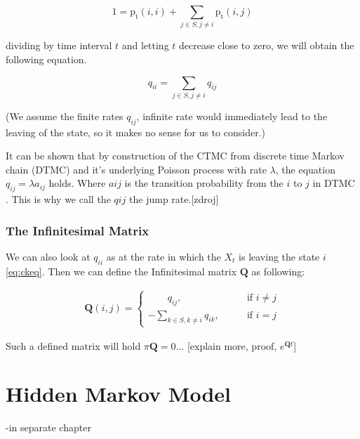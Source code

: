 \documentclass[thesis=M,english]{FITthesis}[2012/10/20]
\newcommand{\matr}[1]{\mathbf{#1}}
\begin{document}
\begin{equation}
1 = \mathrm{p_t}(i,i) + \sum_{j \in S ,j \neq i} \mathrm{p_t}(i,j) 
\end{equation}

dividing by time interval $t$ and letting $t$ decrease close to zero, we will obtain the following equation. 

\begin{equation}\label{eq:qii}
 q_{ii} =  \sum_{j \in S ,j \neq i} q_{ij} 
\end{equation}

(We assume the finite rates $q_{ij}$, infinite rate would immediately lead to the leaving of the state, so it makes no sense for us to consider.)

It can be shown that by construction of the CTMC from discrete time Markov chain (DTMC) and  it's underlying Poisson process with rate $\lambda$, the equation $q_{ij} = \lambda a_{ij}$ holds. Where $a{ij}$ is the transition probability from the $i$ to $j$ in DTMC \label{eq:tp}. This is why we call the $q{ij}$ the jump rate.[zdroj]  


\subsubsection{The Infinitesimal Matrix}

We can also look at $q_{ii}$ as at the rate in which the $X_t$ is leaving the state $i$ \eqref{eq:ckeq}. Then we can define the Infinitesimal matrix $\matr{Q}$ as following:

\begin{equation}
\begin{aligned}  
\matr{Q}(i,j)= 
\begin{cases}
\qquad q_{ij}, \qquad & \text{if } i\neq j\\
- \sum\limits_{k \in S ,k \neq i} q_{ik}, \qquad & \text{if } i=j
\end{cases}
\end{aligned}
\end{equation}

Such a defined matrix will hold $\pi\matr{Q} = 0$... [explain more, proof, $e^{\matr{Q}t}$]




\section{Hidden Markov Model}
-in separate chapter
\end{document}

